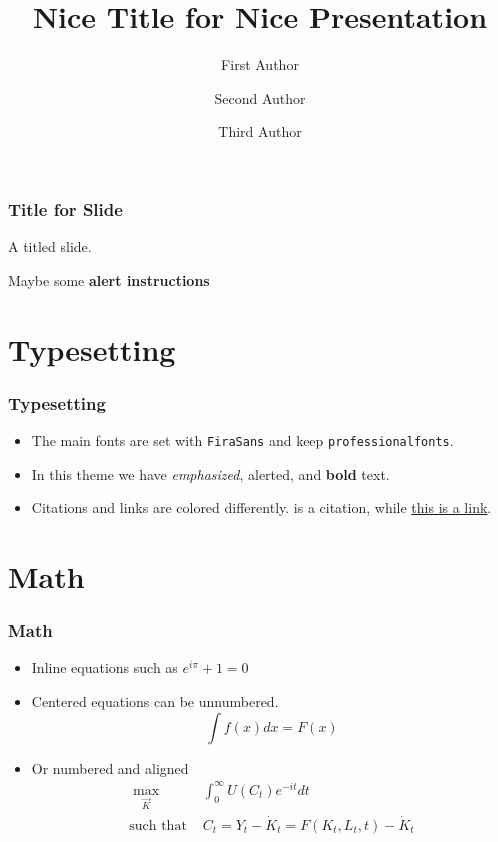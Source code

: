 \documentclass[11pt,xcolor={svgnames},aspectratio=169,usepdftitle=false,notheorems]{beamer}
\begin{document}
\title[]{Nice Title for Nice Presentation}
\author{First Author \and
Second Author \and
Third Author}

\date{}

\begin{frame}
	\titlepage
\end{frame}

\begin{frame}
	\frametitle{Title for Slide}

A titled slide.

Maybe some \alert{\textbf{alert instructions}}

\end{frame}

\section{Typesetting}

\begin{frame}[fragile]
	\frametitle{Typesetting}

\begin{itemize}
	\item The main fonts are set with \verb;FiraSans; and keep \verb;professionalfonts;.
	\item In this theme we have \emph{emphasized}, \alert{alerted}, and \textbf{bold} text.
	\item Citations and links are colored differently. \textcite{acemoglu2008capitaldeepening} is a citation, while \href{https://github.com/rafserqui}{this is a link}.
\end{itemize}
\end{frame}

\section{Math}

\begin{frame}
	\frametitle{Math}
\begin{itemize}
	\item Inline equations such as $e^{i \pi} + 1 = 0$
	\item Centered equations can be unnumbered.
	\[
	\int f(x)dx = F(x)
	\]
	\item Or numbered and aligned
	\begin{align}
        \underset{\vec{K}}{\max} \phantom{\Omega} & \int_0^{\infty} U(C_t) e^{-it} dt \label{eqn:objective} \\
        \text{such that } & C_t = Y_t - \dot{K}_t = F(K_t,L_t,t) - \dot{K}_t \label{eqn:constraint}
    \end{align}
\end{itemize}
\end{frame}
\end{document}
